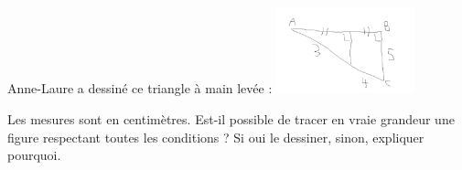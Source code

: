 
\begin{exercice}\label{exo2smath-0093}

    Anne-Laure a dessiné ce triangle à main levée :
        \includegraphics[width=4cm]{faux_triangle.pdf}

    Les mesures sont en centimètres. Est-il possible de tracer en vraie grandeur une figure respectant toutes les conditions ? Si oui le dessiner, sinon, expliquer pourquoi.


\end{exercice}
